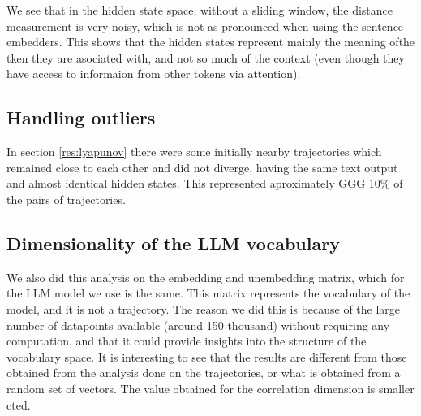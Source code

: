 \documentclass[a4paper,12pt]{article}
\begin{document}
We see that in the hidden state space, without a sliding window, the distance measurement is very noisy, which is not as pronounced when using the sentence embedders. This shows that the hidden states represent mainly the meaning ofthe tken they are asociated with, and not so much of the context (even though they have access to informaion from other tokens via attention). 


\subsection{Handling outliers} %
\label{subsec:appendix_handling_outliers}

In section \ref{res:lyapunov} there were some initially nearby trajectories which remained close to each other and did not diverge, having the same text output and almost identical hidden states. This represented aproximately GGG 10\% of the pairs of trajectories.

\subsection{Dimensionality of the LLM vocabulary}
\label{subsec:appendix_vocab_dim}


We also did this analysis on the embedding and unembedding matrix, which for the LLM model we use is the same. This matrix represents the vocabulary of the model, and it is not a trajectory. 
The reason we did this is because of the large number of datapoints available (around 150 thousand) without requiring any computation, and that it could provide insights into the structure of the vocabulary space. It is interesting to see that the results are different from those obtained from the analysis done on the trajectories, or what is obtained from a random set of vectors. The value obtained for the correlation dimension is smaller   cted.
\end{document}
